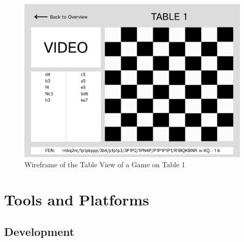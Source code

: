 \begin{figure}[h!]
    \centering
    \includegraphics[width=0.75\linewidth]{figures/wireframe/table-view.png}
    \caption{Wireframe of the Table View of a Game on Table 1}
    \label{fig:app-table-view}
\end{figure}





\section{Tools and Platforms}



\subsection{Development}












